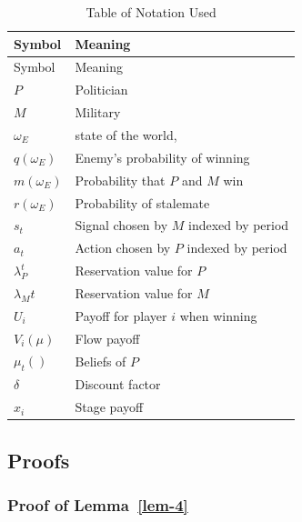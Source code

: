 \documentclass[
  12pt,
]{article}
\theoremstyle{plain}
\theoremstyle{plain}
\theoremstyle{remark}
\begin{document}
\begin{longtable}[]{@{}ll@{}}
\caption{Table of Notation Used}\label{tbl-symbols}\tabularnewline
\toprule\noalign{}
Symbol & Meaning \\
\midrule\noalign{}
\endfirsthead
\toprule\noalign{}
Symbol & Meaning \\
\midrule\noalign{}
\endhead
\bottomrule\noalign{}
\endlastfoot
\(P\) & Politician \\
\(M\) & Military \\
\(\omega_E\) & state of the world, \\
\(q(\omega_E)\) & Enemy's probability of winning \\
\(m(\omega_E)\) & Probability that \(P\) and \(M\) win \\
\(r(\omega_E)\) & Probability of stalemate \\
\(s_t\) & Signal chosen by \(M\) indexed by period \\
\(a_t\) & Action chosen by \(P\) indexed by period \\
\(\lambda_{P}^t\) & Reservation value for \(P\) \\
\(\lambda_{M}t\) & Reservation value for \(M\) \\
\(U_i\) & Payoff for player \(i\) when winning \\
\(V_i(\mu)\) & Flow payoff \\
\(\mu_t()\) & Beliefs of \(P\) \\
\(\delta\) & Discount factor \\
\(x_i\) & Stage payoff \\
\end{longtable}

\subsection{Proofs}\label{proofs}

\subsubsection{\texorpdfstring{Proof of
Lemma~\ref{lem-4}}{Proof of Lemma~}}\label{proof-of-lem-4}
\end{document}
